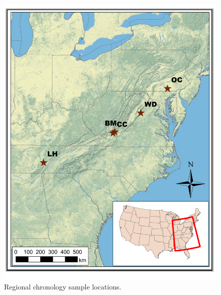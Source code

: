 
\begin{figure}
\centering
\includegraphics[width=5in]{figures/NewClimateNADEF.pdf}
\caption{Regional chronology sample locations.}
\label{fig:map}
\end{figure}

